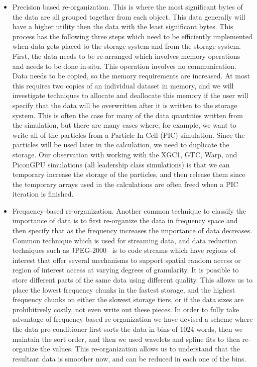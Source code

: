 \begin{itemize} 
	
\item Precision based re-organization. This is where the most significant bytes
	of the data are all grouped together from each object. This data
	generally will have a higher utility then the data with the least
	significant bytes.  This process has the following three steps which
	need to be efficiently implemented when data gets placed to the storage
	system and from the storage system.  First, the data needs to be
	re-arranged which involves memory operations and needs to be done
	in-situ. This operation involves no communication.  Data needs to be
	copied, so the memory requirements are increased. At most this requires
	two copies of an individual dataset in memory, and we will investigate
	techniques to allocate and deallocate this memory if the user will
	specify that the data will be overwritten after it is written to the
	storage system. This is often the case for many of the data quantities
	written from the simulation, but there are many cases where, for
	example, we want to write all of the particles from a Particle In Cell
	(PIC) simulation.  Since the particles will be used later in the
	calculation, we need to duplicate the storage. Our observation with
	working with the XGC1, GTC, Warp, and PiconGPU simulations (all
	leadership class simulations) is that we can temporary increase the
	storage of the particles, and then release them since the temporary
	arrays used in the calculations are often freed when a PIC iteration is
	finished. 
%
\item Frequency-based re-organization.  Another common technique to classify
	the importance of data is to first re-organize the data in frequency
	space and then specify that as the frequency increases the importance
	of data decreases.   Common technique which is used for streaming data,
	and data reduction techniques such as JPEG-2000~\cite{jpeg2000} is to
	code streams which have regions of interest that offer several
	mechanisms to support spatial random access or region of interest
	access at varying degrees of granularity. It is possible to store
	different parts of the same data using different quality.  This allows
	us to place the lowest frequency chunks in the fastest storage, and the
	highest frequency chunks  on either  the slowest storage tiers, or if the data
	sizes are prohibitively  costly, not even write out  these pieces. 
	 In order to fully take advantage of frequency based
	re-organization we have devised a scheme where the data pre-conditioner
	first sorts the data in bins of 1024 words, then we maintain the
	sort order, and then we used wavelets and spline fits to then
	re-organize the values.  This re-organization allows us to understand
	that the resultant data is smoother now, and can be reduced in each one
	of the bins.  \end{itemize}

